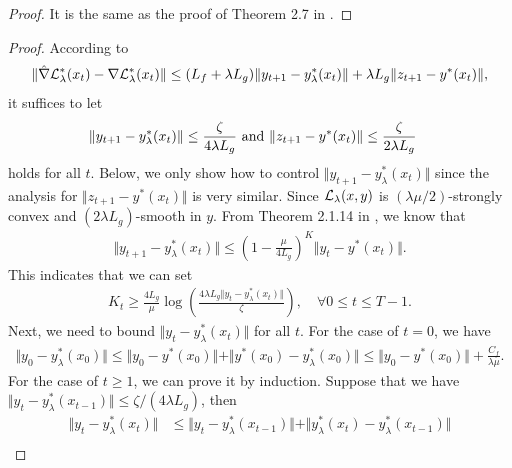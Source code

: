 \propPGD*

\begin{proof}
    It is the same as the proof of Theorem 2.7 in \cite{huang2022efficiently}.
\end{proof}



\properror*
\begin{proof}
According to
\begin{align*}
    \Vert \hat \nabla {\mathcal{L}}_{\lambda}^*(x_t) - \nabla {\mathcal{L}}_{\lambda}^*(x_t) \Vert \le (L_f+ \lambda L_g) \Vert y_{t+1}- y_{\lambda}^*(x_t) \Vert + \lambda L_g \Vert z_{t+1} - y^*(x_t) \Vert,
\end{align*}
it suffices to let 
\begin{align*}
\Vert y_{t+1} - y_{\lambda}^*(x_t) \Vert & \le \frac{\zeta}{4\lambda L_g}   ~{\rm and}~
\Vert z_{t+1} - y^*(x_t) \Vert \le \frac{\zeta}{2 \lambda L_g}
\end{align*}
holds for all $t$. Below, we only show how to control $\Vert y_{t+1} - y_{\lambda}^*(x_t) \Vert$ since the analysis for $ \Vert z_{t+1} - y^*(x_t) \Vert$ is very similar. 
Since ${\mathcal{L}}_{\lambda}(x,y)$ is   $(\lambda \mu /2)$-strongly convex and $(2 \lambda L_g)$-smooth in $y$.
From Theorem 2.1.14 in \cite{nesterov2018lectures}, we know that
\begin{align*}
    \Vert y_{t+1} - y_{\lambda}^*(x_t) \Vert \le \left( 1 - \frac{\mu}{4L_g} \right)^{K} \Vert y_t - y^*(x_t) \Vert.
\end{align*}
This indicates that we can  set
\begin{align*}
    K_t \ge \frac{4 L_g}{\mu} \log \left( 
    \frac{4 \lambda L_g \Vert y_t - y_{\lambda}^*(x_t) \Vert}{\zeta}
    \right), \quad \forall 0 \le t \le T-1.
\end{align*}
Next, we need to bound $\Vert y_t - y_{\lambda}^*(x_t) \Vert$ for all $t$. For the case of $t=0$, we have
\begin{align*}
    \Vert y_0 - y_{\lambda}^*(x_0) \Vert \le \Vert y_0 - y^*(x_0) \Vert + \Vert y^*(x_0) - y_{\lambda}^*(x_0) \Vert \le \Vert y_0 - y^*(x_0) \Vert + \frac{C_f}{\lambda \mu}.
\end{align*}
For the case of $t \ge 1$, we can prove it by induction. Suppose that we have $\Vert y_{t} - y_{\lambda}^*(x_{t-1})\Vert \le \zeta / (4 \lambda L_g)$, then
\begin{align*}
    \Vert y_t - y_{\lambda}^*(x_t) \Vert  &\le  \Vert y_{t} - y_{\lambda}^*(x_{t-1}) \Vert + \Vert y_{\lambda}^*(x_{t}) - y_{\lambda}^*(x_{t-1}) \Vert \\

\end{align*}
\end{proof}
